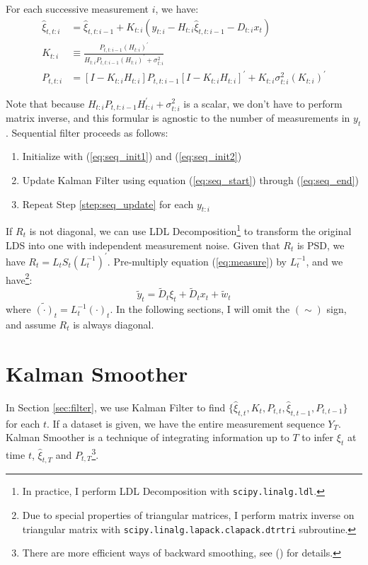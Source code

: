 \documentclass[12pt]{article}
\newenvironment{boenumerate}
    {\begin{enumerate}\renewcommand\labelenumi{\textbf\theenumi}}
    {\end{enumerate}}
\numberwithin{equation}{section}
\begin{document}
For each successive measurement $i$, we have:
\begin{align}
    \hat{\xi}_{t,t:i} &= \hat{\xi}_{t,t:i-1} + K_{t:i}(y_{t:i} - H_{t:i}\hat{\xi}_{t,t:i-1} - D_{t:i}x_{t}) \label{eq:seq_start} \\ 
    K_{t:i} &\equiv \frac{P_{t,t:i-1}(H_{t:i})^{'}}{H_{t:i}P_{t,t:i-1}(H_{t:i})^{'}+\sigma_{t:i}^{2}} \\
    P_{t,t:i} &= [I - K_{t:i}H_{t:i}]P_{t,t:i-1}[I-K_{t:i}H_{t:i}]^{'} + K_{t:i}\sigma_{t:i}^{2}(K_{t:i})^{'} \label{eq:seq_end}
\end{align}

Note that because $H_{t:i}P_{t,t:i-1}H_{t:i}^{'}+\sigma_{t:i}^{2}$ is a scalar, we don't have to perform matrix inverse, and this formular is agnostic to the number of measurements in $y_t$. Sequential filter proceeds as follows:
\begin{boenumerate}
    \item Initialize with (\ref{eq:seq_init1}) and (\ref{eq:seq_init2})
    \item \label{step:seq_update} Update Kalman Filter using equation (\ref{eq:seq_start}) through (\ref{eq:seq_end})
    \item Repeat Step \ref{step:seq_update} for each $y_{t:i}$
\end{boenumerate}

If $R_t$ is not diagonal, we can use LDL Decomposition\footnote{In practice, I perform LDL Decomposition with \texttt{scipy.linalg.ldl}.} to transform the original LDS into one with independent measurement noise. Given that $R_t$ is PSD, we have $R_t = L_tS_t(L_t^{-1})^{'}$. Pre-multiply equation (\ref{eq:measure}) by $L_t^{-1}$, and we have\footnote{Due to special properties of triangular matrices, I perform matrix inverse on triangular matrix with \texttt{scipy.linalg.lapack.clapack.dtrtri} subroutine.}:
\[
    \tilde{y}_t = \tilde{D}_t\xi_{t} + \tilde{D}_{t}x_t + \tilde{w}_t
\]
where $\tilde{(\cdot)}_t = L_t^{-1}(\cdot)_t$. In the following sections, I will omit the $(\sim)$ sign, and assume $R_t$ is always diagonal. 

\section{Kalman Smoother} \label{sec:smoother}
In Section \ref{sec:filter}, we use Kalman Filter to find $\{\hat{\xi}_{t,t}, K_t, P_{t,t}, \hat{\xi}_{t,t-1}, P_{t,t-1}\}$ for each $t$. If a dataset is given, we have the entire measurement sequence $Y_T$. Kalman Smoother is a technique of integrating information up to $T$ to infer $\xi_t$ at time $t$, $\hat{\xi}_{t,T}$ and $P_{t,T}$\footnote{There are more efficient ways of backward smoothing, see (\cite{koopman_1993}) for details.}. 
\end{document}
